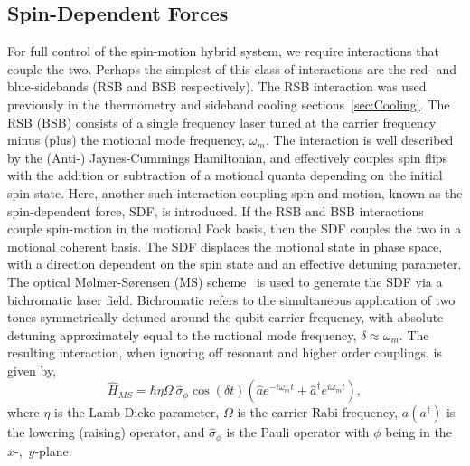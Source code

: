 \subsection{Spin-Dependent Forces}
\label{sec:Spin-Dependent Forces}
    For full control of the spin-motion hybrid system, we require interactions
    that couple the two. Perhaps the simplest of this class of interactions
    are the red- and blue-sidebands (RSB and BSB respectively). The  RSB
    interaction was used previously in the thermometry and sideband cooling
    sections~\ref{sec:Cooling}. The RSB (BSB) consists of a single frequency
    laser tuned at the carrier frequency minus (plus) the motional mode frequency,
    $\omega_m$. The interaction is well described by the (Anti-) Jaynes-Cummings
    Hamiltonian, and effectively couples spin flips with the addition or
    subtraction of a motional quanta depending on the initial spin state. Here,
    another such interaction coupling spin and motion, known as the
    spin-dependent force, SDF, is introduced. If the RSB and BSB interactions couple spin-motion in
    the motional Fock basis, then the SDF couples the two in a
    motional coherent basis. The SDF displaces the motional state in phase
    space, with a direction dependent on the spin state and an effective detuning parameter.\\
    The optical Mølmer-Sørensen (MS) scheme~\cite{} is used to generate the
    SDF via a bichromatic laser field. Bichromatic refers to the simultaneous
    application of two tones symmetrically detuned around the qubit carrier
    frequency, with absolute detuning approximately equal to the motional mode
    frequency, $\delta \approx \omega_{m}$. The resulting interaction, when
    ignoring off resonant and higher order couplings, is given by,
    \begin{equation}
        \hat{H}_{MS} = \hbar \eta\Omega~\hat{\sigma}_\phi\cos(\delta t) \left( \hat{a} e^{-i\omega_{m} t} + \hat{a}^\dagger e^{i\omega_{m} t} \right),
    \end{equation}
    where $\eta$ is the Lamb-Dicke parameter, $\Omega$ is the carrier Rabi
    frequency, $a(a^\dagger)$ is the lowering (raising) operator, and
    $\hat{\sigma}_\phi$ is the Pauli operator with $\phi$ being in the $x$-,~$y$-plane.
